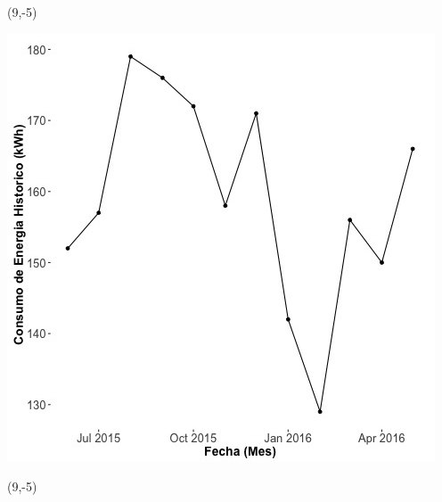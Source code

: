 \documentclass{article}\usepackage[]{graphicx}\usepackage[]{color}
\newenvironment{knitrout}{}{} %
\begin{document}
 \begin{textblock}{1}(9,-5)
\begin{minipage}{20em}
\begingroup

\endgroup
\end{minipage}
\end{textblock}

\begin{knitrout}
\color{fgcolor}
\includegraphics[scale=0.65]{figure/A20_historico_energia} 
\end{knitrout}

 \begin{textblock}{1}(9,-5)
\begin{minipage}{20em}
\begingroup

\endgroup
\end{minipage}
\end{textblock}
\end{document}
